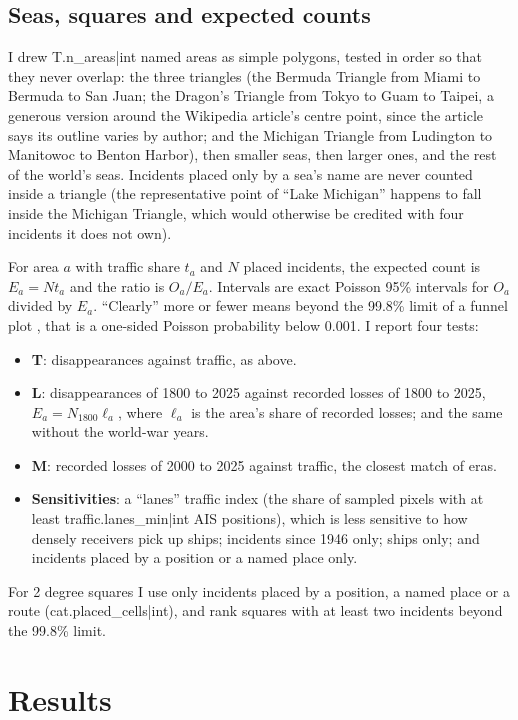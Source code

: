 \documentclass[11pt,a4paper]{article}
\begin{document}
\subsection{Seas, squares and expected counts}
I drew {{T.n_areas|int}} named areas as simple polygons, tested in order so that they never overlap: the three triangles (the Bermuda Triangle from Miami to Bermuda to San Juan; the Dragon's Triangle from Tokyo to Guam to Taipei, a generous version around the Wikipedia article's centre point, since the article says its outline varies by author; and the Michigan Triangle from Ludington to Manitowoc to Benton Harbor), then smaller seas, then larger ones, and the rest of the world's seas. Incidents placed only by a sea's name are never counted inside a triangle (the representative point of ``Lake Michigan'' happens to fall inside the Michigan Triangle, which would otherwise be credited with four incidents it does not own).

For area $a$ with traffic share $t_a$ and $N$ placed incidents, the expected count is $E_a = N t_a$ and the ratio is $O_a/E_a$. Intervals are exact Poisson 95\% intervals for $O_a$ \citep{garwood} divided by $E_a$. ``Clearly'' more or fewer means beyond the 99.8\% limit of a funnel plot \citep{spiegelhalter}, that is a one-sided Poisson probability below 0.001. I report four tests:
\begin{itemize}
\item \textbf{T}: disappearances against traffic, as above.
\item \textbf{L}: disappearances of 1800 to 2025 against recorded losses of 1800 to 2025, $E_a = N_{1800} \ell_a$, where $\ell_a$ is the area's share of recorded losses; and the same without the world-war years.
\item \textbf{M}: recorded losses of 2000 to 2025 against traffic, the closest match of eras.
\item \textbf{Sensitivities}: a ``lanes'' traffic index (the share of sampled pixels with at least {{traffic.lanes_min|int}} AIS positions), which is less sensitive to how densely receivers pick up ships; incidents since 1946 only; ships only; and incidents placed by a position or a named place only.
\end{itemize}
For 2 degree squares I use only incidents placed by a position, a named place or a route ({{cat.placed_cells|int}}), and rank squares with at least two incidents beyond the 99.8\% limit.

\section{Results}
\end{document}
